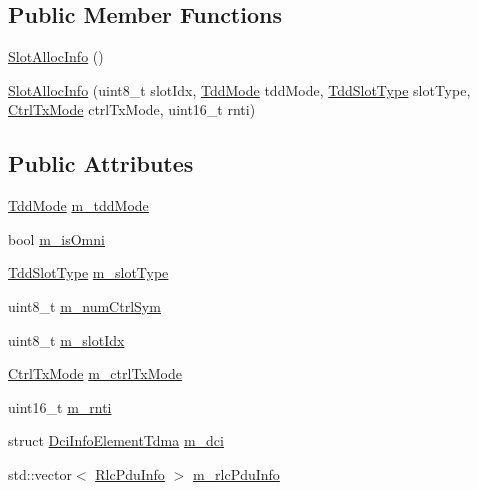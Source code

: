 \subsection*{Public Member Functions}
\begin{DoxyCompactItemize}
\item 
\hyperlink{structns3_1_1SlotAllocInfo_a2011324a451da9d69ce8ccc77c00a995}{Slot\+Alloc\+Info} ()
\item 
\hyperlink{structns3_1_1SlotAllocInfo_ab2616f374e450168d20aace18d831398}{Slot\+Alloc\+Info} (uint8\+\_\+t slot\+Idx, \hyperlink{structns3_1_1SlotAllocInfo_a6cad60db1d39034f1851e2cea625fe5d}{Tdd\+Mode} tdd\+Mode, \hyperlink{structns3_1_1SlotAllocInfo_a3ea7cb503bfd0c9a4df55a71b81b9331}{Tdd\+Slot\+Type} slot\+Type, \hyperlink{structns3_1_1SlotAllocInfo_adcbd067d82be6260b3399167d8f0b4ec}{Ctrl\+Tx\+Mode} ctrl\+Tx\+Mode, uint16\+\_\+t rnti)
\end{DoxyCompactItemize}
\subsection*{Public Attributes}
\begin{DoxyCompactItemize}
\item 
\hyperlink{structns3_1_1SlotAllocInfo_a6cad60db1d39034f1851e2cea625fe5d}{Tdd\+Mode} \hyperlink{structns3_1_1SlotAllocInfo_adc9f78d415fa8b809b24ae7dd42ba2de}{m\+\_\+tdd\+Mode}
\item 
bool \hyperlink{structns3_1_1SlotAllocInfo_a74638aa7ce40a47739a8150858039a8b}{m\+\_\+is\+Omni}
\item 
\hyperlink{structns3_1_1SlotAllocInfo_a3ea7cb503bfd0c9a4df55a71b81b9331}{Tdd\+Slot\+Type} \hyperlink{structns3_1_1SlotAllocInfo_af9c414596e8408e272369cf8a7f32470}{m\+\_\+slot\+Type}
\item 
uint8\+\_\+t \hyperlink{structns3_1_1SlotAllocInfo_a47a2d84259f6db4ea82f802da47263f2}{m\+\_\+num\+Ctrl\+Sym}
\item 
uint8\+\_\+t \hyperlink{structns3_1_1SlotAllocInfo_af1cbd124e86188e89e25b4eef6ccab90}{m\+\_\+slot\+Idx}
\item 
\hyperlink{structns3_1_1SlotAllocInfo_adcbd067d82be6260b3399167d8f0b4ec}{Ctrl\+Tx\+Mode} \hyperlink{structns3_1_1SlotAllocInfo_a27e7038009cd4a95c9f0f1f0ec350d60}{m\+\_\+ctrl\+Tx\+Mode}
\item 
uint16\+\_\+t \hyperlink{structns3_1_1SlotAllocInfo_abdcf61d61e08657959f860faf592331d}{m\+\_\+rnti}
\item 
struct \hyperlink{structns3_1_1DciInfoElementTdma}{Dci\+Info\+Element\+Tdma} \hyperlink{structns3_1_1SlotAllocInfo_a480bd3a92cebe515c6720cba5e6b4e2c}{m\+\_\+dci}
\item 
std\+::vector$<$ \hyperlink{structns3_1_1RlcPduInfo}{Rlc\+Pdu\+Info} $>$ \hyperlink{structns3_1_1SlotAllocInfo_a7869e73dc90c4579643a7f044fb4ea6f}{m\+\_\+rlc\+Pdu\+Info}
\end{DoxyCompactItemize}


